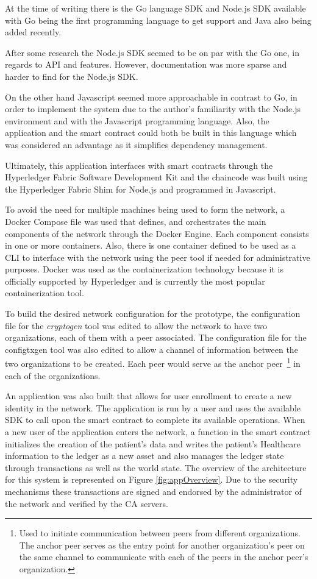 At the time of writing there is the Go language SDK and Node.js SDK available
with Go being the first programming language to get support and Java also being
added recently. 

After some research the Node.js SDK seemed to be on par with the Go one, in
regards to API and features. However, documentation was more sparse and harder
to find for the Node.js SDK. 

On the other hand Javascript seemed more approachable in contrast to Go, in
order to implement the system due to the author's familiarity with the Node.js
environment and with the Javascript programming language. Also, the application
and the smart contract could both be built in this language which was
considered an advantage as it simplifies dependency management. 

Ultimately, this application interfaces with smart contracts through the
Hyperledger Fabric Software Development Kit and the chaincode was built using
the Hyperledger Fabric Shim for Node.js and programmed in Javascript.

To avoid the need for multiple machines being used to form the network, a
Docker Compose file was used that defines, and orchestrates the main components
of the network through the Docker Engine. Each component consists in one or
more containers. Also, there is one  container defined to be used as a CLI to
interface with the network using the peer tool if needed for administrative
purposes. Docker was used as the containerization technology because it is
officially supported by Hyperledger and is currently the most popular
containerization tool.

To build the desired network configuration for the prototype, the configuration
file for the \textit{cryptogen} tool was edited to allow the network to have
two organizations, each of them with a peer associated. The configuration file
for the configtxgen tool was also edited to allow a channel of information
between the two organizations to be created. Each peer would serve as the
anchor peer~\footnote{Used to initiate communication between peers from
different organizations. The anchor peer serves as the entry point for another
organization’s peer on the same channel to communicate with each of the peers
in the anchor peer’s organization.} in each of the organizations.

An application was also built that allows for user enrollment to create a new
identity in the network. The application is run by a user and uses the
available SDK to call upon the smart contract to complete its available
operations. When a new user of the application enters the network, a function
in the smart contract initializes the creation of the patient's data and writes
the patient's Healthcare information to the ledger as a new asset and also
manages the ledger state through transactions as well as the world state.  The
overview of the architecture for this system is represented on Figure
\ref{fig:appOverview}. Due to the security mechanisms these transactions are
signed and endorsed by the administrator of the network and verified by the CA
servers.

